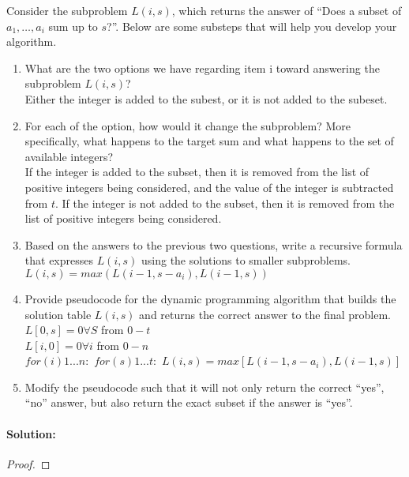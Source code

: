 \documentclass[12pt]{article}
\begin{document}
Consider the subproblem $L(i, s)$, which returns the answer of “Does a
subset of $a_1, \dots, a_i$ sum up to $s$?”.  Below are some substeps
that will help you develop your algorithm.  
\begin{enumerate}
    \item What are the two options we have regarding item i toward answering the subproblem $L(i, s)$? \\
        Either the integer is added to the subest, or it is not added to the subeset. 

    \item For each of the option, how would it change the subproblem? More
    specifically, what happens to the target sum and what happens to the set
    of available integers? \\
        If the integer is added to the subset, then it is removed from the list of positive integers being considered, and the value of the integer is subtracted from $t$.
        If the integer is not added to the subset, then it is removed from the list of positive integers being considered. 

    \item Based on the answers to the previous two questions, write a
    recursive formula that expresses $L(i, s)$ using the solutions to smaller
    subproblems.  \\
        $L(i, s) = max( L(i-1, s-a_i) , L(i-1, s) )$

    \item Provide pseudocode for the dynamic
    programming algorithm that builds the solution table $L(i, s)$ and returns
    the correct answer to the final problem.  
        $L[0,s] = 0 \forall S$ from $0 - t$\\
        $L[i,0] = 0 \forall i$ from $0 - n$\\
        $for (i) 1 ... n:$
            $for (s) 1 ... t:$
                $L(i,s) = max [ L(i-1,s-a_i) , L(i-1,s) ]$
        
    \item Modify the pseudocode such that it will not only return the correct “yes”, “no” answer, but also return the exact subset if the answer is “yes”.
        
        
\end{enumerate}

\paragraph{Solution:}
\begin{proof}

\end{proof}
\end{document}
